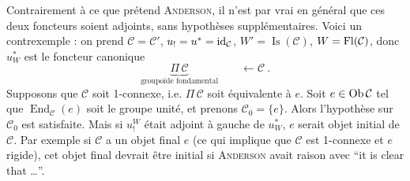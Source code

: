 Contrairement à ce que prétend \textsc{Anderson}, il n'est par vrai en général que ces deux %
foncteurs soient adjoints, sans hypothèses supplémentaires. Voici un contrexemple : on prend $\mathcal{C} = \mathcal{C}'$, $u_! = u^* = \mathrm{id}_{\mathcal{C}}$, $W' = \operatorname{Is}(\mathcal{C})$, $W = \mathrm{Fl}(\mathcal{C})$, donc $u_W^*$ est le foncteur canonique
\[
\underbrace{\Pi\,\mathcal{C}}_{\text{groupoïde fondamental}} \qquad \longleftarrow \mathcal{C}\ .
\]
Supposons que $\mathcal{C}$ soit 1-connexe, i.e. $\Pi\,\mathcal{C}$ soit équivalente à $e$. Soit $e\in\operatorname{Ob}\mathcal{C}$ tel que $\operatorname{End}_{\mathcal{C}}(e)$ soit le groupe unité, et prenons $\mathcal{C}_0 = \{e\}$. Alors l'hypothèse sur $\mathcal{C}_0$ est satisfaite. Mais si $u_!^W$ était adjoint à gauche de $u_W^*$, $e$ serait objet initial de $\mathcal{C}$. Par exemple si $\mathcal{C}$ a un objet final $e$ (ce qui implique que $\mathcal{C}$ est 1-connexe et $e$ rigide), cet objet final devrait être initial si \textsc{Anderson} avait raison avec “it is clear that \ldots”.

